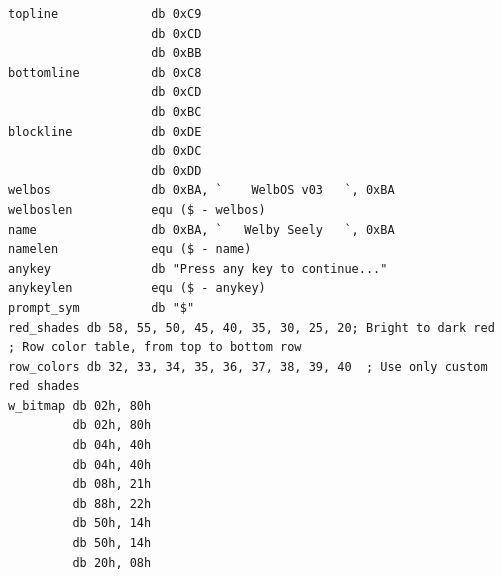 \documentclass{article}
\begin{document}
\begin{lstlisting}[caption={loaderV03.asm listing}, captionpos=t]
topline             db 0xC9
                    db 0xCD
                    db 0xBB
bottomline          db 0xC8
                    db 0xCD
                    db 0xBC
blockline           db 0xDE
                    db 0xDC
                    db 0xDD
welbos              db 0xBA, `    WelbOS v03   `, 0xBA
welboslen           equ ($ - welbos)
name                db 0xBA, `   Welby Seely   `, 0xBA
namelen             equ ($ - name)
anykey              db "Press any key to continue..."
anykeylen           equ ($ - anykey)
prompt_sym          db "$"
red_shades db 58, 55, 50, 45, 40, 35, 30, 25, 20; Bright to dark red
; Row color table, from top to bottom row
row_colors db 32, 33, 34, 35, 36, 37, 38, 39, 40  ; Use only custom red shades
w_bitmap db 02h, 80h
         db 02h, 80h
         db 04h, 40h
         db 04h, 40h
         db 08h, 21h
         db 88h, 22h
         db 50h, 14h
         db 50h, 14h
         db 20h, 08h
    \end{lstlisting}
\end{document}
